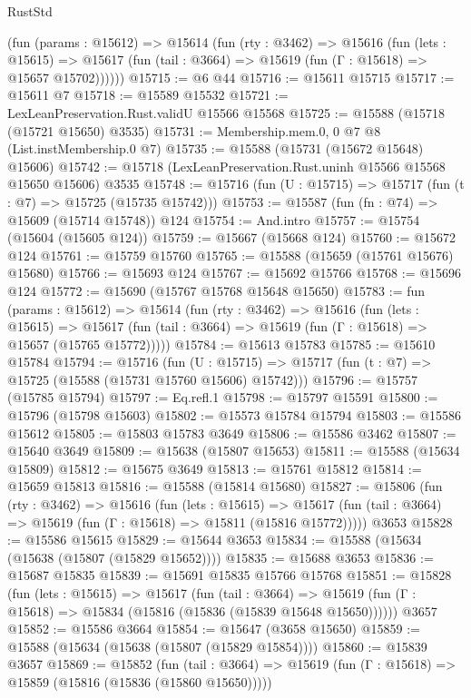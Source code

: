 \begin{lexlean}{RustStd}
\begin{coremodule}
      (fun (params : @15612) =>
      @15614
        (fun (rty : @3462) =>
        @15616
          (fun (lets : @15615) =>
          @15617 (fun (tail : @3664) => @15619 (fun (Γ : @15618) => @15657 @15702))))))
@15715 := @6 @44
@15716 := @15611 @15715
@15717 := @15611 @7
@15718 := @15589 @15532
@15721 := LexLeanPreservation.Rust.validU @15566 @15568
@15725 := @15588 (@15718 (@15721 @15650) @3535)
@15731 := Membership.mem.{0, 0} @7 @8 (List.instMembership.{0} @7)
@15735 := @15588 (@15731 (@15672 @15648) @15606)
@15742 := @15718 (LexLeanPreservation.Rust.uninh @15566 @15568 @15650 @15606) @3535
@15748 := @15716 (fun (U : @15715) => @15717 (fun (t : @7) => @15725 (@15735 @15742)))
@15753 := @15587 (fun (fn : @74) => @15609 (@15714 @15748)) @124
@15754 := And.intro
@15757 := @15754 (@15604 (@15605 @124))
@15759 := @15667 (@15668 @124)
@15760 := @15672 @124
@15761 := @15759 @15760
@15765 := @15588 (@15659 (@15761 @15676) @15680)
@15766 := @15693 @124
@15767 := @15692 @15766
@15768 := @15696 @124
@15772 := @15690 (@15767 @15768 @15648 @15650)
@15783 := fun (params : @15612) =>
  @15614
    (fun (rty : @3462) =>
    @15616
      (fun (lets : @15615) =>
      @15617 (fun (tail : @3664) => @15619 (fun (Γ : @15618) => @15657 (@15765 @15772)))))
@15784 := @15613 @15783
@15785 := @15610 @15784
@15794 := @15716
    (fun (U : @15715) => @15717 (fun (t : @7) => @15725 (@15588 (@15731 @15760 @15606) @15742)))
@15796 := @15757 (@15785 @15794)
@15797 := Eq.refl.{1}
@15798 := @15797 @15591
@15800 := @15796 (@15798 @15603)
@15802 := @15573 @15784 @15794
@15803 := @15586 @15612
@15805 := @15803 @15783 @3649
@15806 := @15586 @3462
@15807 := @15640 @3649
@15809 := @15638 (@15807 @15653)
@15811 := @15588 (@15634 @15809)
@15812 := @15675 @3649
@15813 := @15761 @15812
@15814 := @15659 @15813
@15816 := @15588 (@15814 @15680)
@15827 := @15806
    (fun (rty : @3462) =>
    @15616
      (fun (lets : @15615) =>
      @15617 (fun (tail : @3664) => @15619 (fun (Γ : @15618) => @15811 (@15816 @15772)))))
    @3653
@15828 := @15586 @15615
@15829 := @15644 @3653
@15834 := @15588 (@15634 (@15638 (@15807 (@15829 @15652))))
@15835 := @15688 @3653
@15836 := @15687 @15835
@15839 := @15691 @15835 @15766 @15768
@15851 := @15828
    (fun (lets : @15615) =>
    @15617
      (fun (tail : @3664) =>
      @15619 (fun (Γ : @15618) => @15834 (@15816 (@15836 (@15839 @15648 @15650))))))
    @3657
@15852 := @15586 @3664
@15854 := @15647 (@3658 @15650)
@15859 := @15588 (@15634 (@15638 (@15807 (@15829 @15854))))
@15860 := @15839 @3657
@15869 := @15852
    (fun (tail : @3664) => @15619 (fun (Γ : @15618) => @15859 (@15816 (@15836 (@15860 @15650)))))

\end{coremodule}
\end{lexlean}
